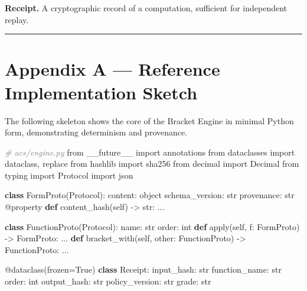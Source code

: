 \documentclass[11pt,a4paper]{article}
\newenvironment{Shaded}{\begin{snugshade}\small}{\end{snugshade}}
\newcommand{\ImportTok}[1]{#1}
\newcommand{\KeywordTok}[1]{\textbf{#1}}
\newcommand{\CommentTok}[1]{\textit{\textcolor{gray}{#1}}}
\newcommand{\VariableTok}[1]{#1}
\newcommand{\OperatorTok}[1]{#1}
\newcommand{\BuiltInTok}[1]{#1}
\newcommand{\AttributeTok}[1]{#1}
\newcommand{\NormalTok}[1]{#1}
\begin{document}
\textbf{Receipt.} A cryptographic record of a computation, sufficient
for independent replay.

\begin{center}\rule{0.5\linewidth}{0.5pt}\end{center}

\hypertarget{appendix-a-reference-implementation-sketch}{%
\section{Appendix A --- Reference Implementation
Sketch}\label{appendix-a-reference-implementation-sketch}}

The following skeleton shows the core of the Bracket Engine in minimal
Python form, demonstrating determinism and provenance.

\begin{Shaded}
\begin{Highlighting}[]
\CommentTok{\# acs/engine.py}
\ImportTok{from}\NormalTok{ \_\_future\_\_ }\ImportTok{import}\NormalTok{ annotations}
\ImportTok{from}\NormalTok{ dataclasses }\ImportTok{import}\NormalTok{ dataclass, replace}
\ImportTok{from}\NormalTok{ hashlib }\ImportTok{import}\NormalTok{ sha256}
\ImportTok{from}\NormalTok{ decimal }\ImportTok{import}\NormalTok{ Decimal}
\ImportTok{from}\NormalTok{ typing }\ImportTok{import}\NormalTok{ Protocol}
\ImportTok{import}\NormalTok{ json}

\KeywordTok{class}\NormalTok{ FormProto(Protocol):}
\NormalTok{    content: }\BuiltInTok{object}
\NormalTok{    schema\_version: }\BuiltInTok{str}
\NormalTok{    provenance: }\BuiltInTok{str}
    \AttributeTok{@property}
    \KeywordTok{def}\NormalTok{ content\_hash(}\VariableTok{self}\NormalTok{) }\OperatorTok{{-}\textgreater{}} \BuiltInTok{str}\NormalTok{: ...}

\KeywordTok{class}\NormalTok{ FunctionProto(Protocol):}
\NormalTok{    name: }\BuiltInTok{str}
\NormalTok{    order: }\BuiltInTok{int}
    \KeywordTok{def} \BuiltInTok{apply}\NormalTok{(}\VariableTok{self}\NormalTok{, f: FormProto) }\OperatorTok{{-}\textgreater{}}\NormalTok{ FormProto: ...}
    \KeywordTok{def}\NormalTok{ bracket\_with(}\VariableTok{self}\NormalTok{, other: FunctionProto) }\OperatorTok{{-}\textgreater{}}\NormalTok{ FunctionProto: ...}

\AttributeTok{@dataclass}\NormalTok{(frozen}\OperatorTok{=}\VariableTok{True}\NormalTok{)}
\KeywordTok{class}\NormalTok{ Receipt:}
\NormalTok{    input\_hash: }\BuiltInTok{str}
\NormalTok{    function\_name: }\BuiltInTok{str}
\NormalTok{    order: }\BuiltInTok{int}
\NormalTok{    output\_hash: }\BuiltInTok{str}
\NormalTok{    policy\_version: }\BuiltInTok{str}
\NormalTok{    grade: }\BuiltInTok{str}


\end{Highlighting}
\end{Shaded}
\end{document}
